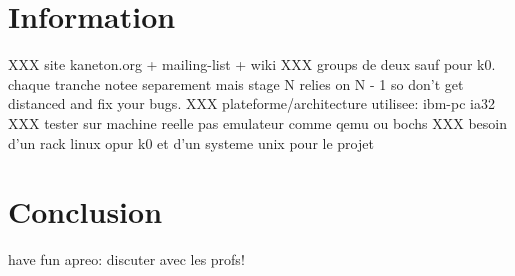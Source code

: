 %
%

\section{Information}

XXX site kaneton.org + mailing-list + wiki
XXX groups de deux sauf pour k0. chaque tranche notee separement mais stage N
  relies on N - 1 so don't get distanced and fix your bugs.
XXX plateforme/architecture utilisee: ibm-pc ia32
XXX tester sur machine reelle pas emulateur comme qemu ou bochs
XXX besoin d'un rack linux opur k0 et d'un systeme unix pour le projet

%
%

\section{Conclusion}

have fun
apreo: discuter avec les profs!


